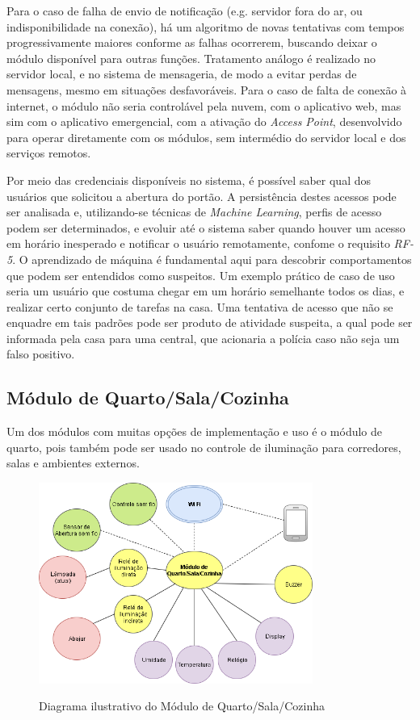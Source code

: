 Para o caso de falha de envio de notificação (e.g. servidor fora do ar, ou indisponibilidade na conexão), há um algoritmo de novas tentativas com tempos progressivamente maiores conforme as falhas ocorrerem, buscando deixar o módulo disponível para outras funções. Tratamento análogo é realizado no servidor local, e no sistema de mensageria, de modo a evitar perdas de mensagens, mesmo em situações desfavoráveis. Para o caso de falta de conexão à internet, o módulo não seria controlável pela nuvem, com o aplicativo web, mas sim com o aplicativo emergencial, com a ativação do \textit{Access Point}, desenvolvido para operar diretamente com os módulos, sem intermédio do servidor local e dos serviços remotos.

Por meio das credenciais disponíveis no sistema, é possível saber qual dos usuários que solicitou a abertura do portão. A persistência destes acessos pode ser analisada e, utilizando-se técnicas de \emph{Machine Learning}, perfis de acesso podem ser determinados, e evoluir até o sistema saber quando houver um acesso em horário inesperado e notificar o usuário remotamente, confome o requisito \emph{RF-5}. O aprendizado de máquina é fundamental aqui para descobrir comportamentos que podem ser entendidos como suspeitos. Um exemplo prático de caso de uso seria um usuário que costuma chegar em um horário semelhante todos os dias, e realizar certo conjunto de tarefas na casa. Uma tentativa de acesso que não se enquadre em tais padrões pode ser produto de atividade suspeita, a qual pode ser informada pela casa para uma central, que acionaria a polícia caso não seja um falso positivo.

\subsection{Módulo de Quarto/Sala/Cozinha}
Um dos módulos com muitas opções de implementação e uso é o módulo de quarto, pois também pode ser usado no controle de iluminação para corredores, salas e ambientes externos.

\begin{figure}[H]
	\centering
	\caption{Diagrama ilustrativo do Módulo de Quarto/Sala/Cozinha}
	\includegraphics[width=0.8\textwidth]{diagramaModuloQuarto}
	\label{fig:diagramaModuloQuarto}
\end{figure}

